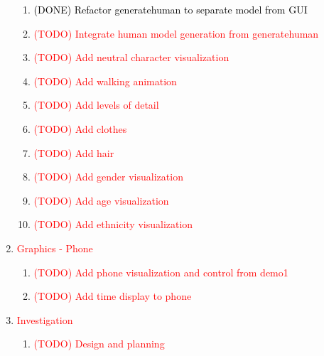 \documentclass[a4paper, twoside]{article}
\begin{document}
\begin{enumerate}
\begin{enumerate}
		\item{} \textcolor{black}{(DONE) Refactor generatehuman to separate model from GUI}
		\item{} \textcolor{red}{(TODO) Integrate human model generation from generatehuman}
		\item{} \textcolor{red}{(TODO) Add neutral character visualization}
		\item{} \textcolor{red}{(TODO) Add walking animation}
		\item{} \textcolor{red}{(TODO) Add levels of detail}
		\item{} \textcolor{red}{(TODO) Add clothes}
		\item{} \textcolor{red}{(TODO) Add hair}
		\item{} \textcolor{red}{(TODO) Add gender visualization}
		\item{} \textcolor{red}{(TODO) Add age visualization}
		\item{} \textcolor{red}{(TODO) Add ethnicity visualization}
	\end{enumerate}
	\item{} \textcolor{red}{Graphics - Phone} \begin{enumerate}
		\item{} \textcolor{red}{(TODO) Add phone visualization and control from demo1}
		\item{} \textcolor{red}{(TODO) Add time display to phone}
	\end{enumerate}
	\item{} \textcolor{red}{Investigation} \begin{enumerate}
		\item{} \textcolor{red}{(TODO) Design and planning}
	\end{enumerate}
\end{enumerate}
\end{document}
